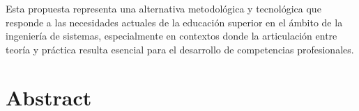 \documentclass[letter,oneside,12pt,spanish]{report}
\begin{document}
{\begin{description}
{\begin{spacing}{1.7}
    Esta propuesta representa una alternativa metodológica y tecnológica que responde a las necesidades actuales de la educación superior en el ámbito de la ingeniería de sistemas, especialmente en contextos donde la articulación entre teoría y práctica resulta esencial para el desarrollo de competencias profesionales.
    \end{spacing}
  }
\end{description}}\normalsize



\newpage

\chapter*{Abstract}
\end{document}
